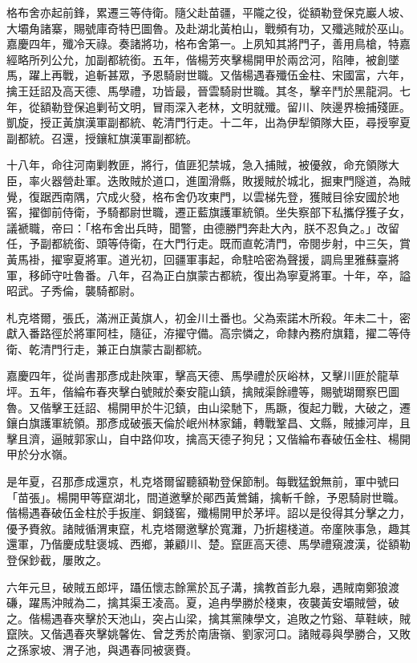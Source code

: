 \begin{pinyinscope}
格布舍亦起前鋒，累遷三等侍衛。隨父赴苗疆，平隴之役，從額勒登保克巖人坡、大壩角諸寨，賜號庫奇特巴圖魯。及赴湖北黃柏山，戰頻有功，又殲逃賊於巫山。嘉慶四年，殲冷天祿。奏諸將功，格布舍第一。上夙知其將門子，善用鳥槍，特嘉經略所列公允，加副都統銜。五年，偕楊芳夾擊楊開甲於兩岔河，陷陣，被創墜馬，躍上再戰，追斬甚眾，予恩騎尉世職。又偕楊遇春殲伍金柱、宋國富，六年，擒王廷詔及高天德、馬學禮，功皆最，晉雲騎尉世職。其冬，擊辛鬥於黑龍洞。七年，從額勒登保追剿茍文明，冒雨深入老林，文明就殲。留川、陜邊界檢捕殘匪。凱旋，授正黃旗漢軍副都統、乾清門行走。十二年，出為伊犁領隊大臣，尋授寧夏副都統。召還，授鑲紅旗漢軍副都統。

十八年，命往河南剿教匪，將行，值匪犯禁城，急入捕賊，被優敘，命充領隊大臣，率火器營赴軍。迭敗賊於道口，進圍滑縣，敗援賊於城北，掘東門隧道，為賊覺，復踞西南隅，穴成火發，格布舍仍攻東門，以雲梯先登，獲賊目徐安國於地窖，擢御前侍衛，予騎都尉世職，遷正藍旗護軍統領。坐失察部下私攜俘獲子女，議褫職，帝曰：「格布舍出兵時，聞警，由德勝門奔赴大內，朕不忍負之。」改留任，予副都統銜、頭等侍衛，在大門行走。既而直乾清門，帝閱步射，中三矢，賞黃馬褂，擢寧夏將軍。道光初，回疆軍事起，命駐哈密為聲援，調烏里雅蘇臺將軍，移師守吐魯番。八年，召為正白旗蒙古都統，復出為寧夏將軍。十年，卒，謚昭武。子秀倫，襲騎都尉。

札克塔爾，張氏，滿洲正黃旗人，初金川土番也。父為索諾木所殺。年未二十，密獻入番路徑於將軍阿桂，隨征，洊擢守備。高宗憐之，命隸內務府旗籍，擢二等侍衛、乾清門行走，兼正白旗蒙古副都統。

嘉慶四年，從尚書那彥成赴陜軍，擊高天德、馬學禮於灰峪林，又擊川匪於龍草坪。五年，偕綸布春夾擊白號賊於秦安龍山鎮，擒賊渠餘禮等，賜號瑚爾察巴圖魯。又偕擊王廷詔、楊開甲於牛氾鎮，由山梁馳下，馬蹶，復起力戰，大破之，遷鑲白旗護軍統領。那彥成破張天倫於岷州林家鋪，轉戰鞏昌、文縣，賊據河岸，且擊且濟，逼賊郭家山，自中路仰攻，擒高天德子狗兒；又偕綸布春破伍金柱、楊開甲於分水嶺。

是年夏，召那彥成還京，札克塔爾留聽額勒登保節制。每戰猛銳無前，軍中號曰「苗張」。楊開甲等竄湖北，間道邀擊於鄖西黃鶯鋪，擒斬千餘，予恩騎尉世職。偕楊遇春破伍金柱於手扳崖、銅錢窖，殲楊開甲於茅坪。詔以是役得其分擊之力，優予賚敘。諸賊循渭東竄，札克塔爾邀擊於寬灘，乃折趨棧道。帝廑陜事急，趣其還軍，乃偕慶成駐褒城、西鄉，兼顧川、楚。竄匪高天德、馬學禮窺渡漢，從額勒登保鈔截，屢敗之。

六年元旦，破賊五郎坪，躡伍懷志餘黨於瓦子溝，擒教首彭九皋，遇賊南鄭狼渡磏，躍馬沖賊為二，擒其渠王凌高。夏，追冉學勝於棧東，夜襲黃安壩賊營，破之。偕楊遇春夾擊於天池山，突占山梁，擒其黨陳學文，追敗之竹谿、草鞋峽，賊竄陜。又偕遇春夾擊姚馨佐、曾芝秀於南唐嶺、劉家河口。諸賊尋與學勝合，又敗之孫家坡、渭子池，與遇春同被褒賚。


\end{pinyinscope}
